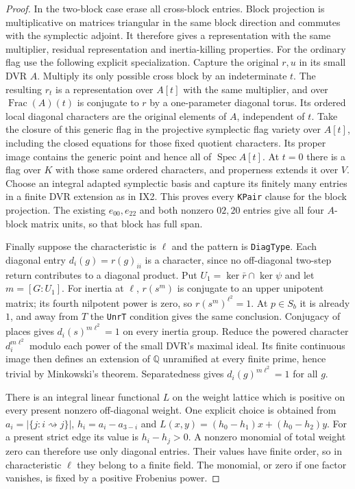 \begin{proof}
In the two-block case erase all cross-block entries.
Block projection is multiplicative on matrices triangular
in the same block direction and commutes with the
symplectic adjoint.  It therefore gives a representation
with the same multiplier, residual representation and
inertia-killing properties.  For the ordinary flag use
the following explicit specialization.  Capture the
original $r,u$ in its small DVR $A$.  Multiply its only
possible cross block by an indeterminate $t$.  The
resulting $r_t$ is a representation over $A[t]$ with the
same multiplier, and over $\operatorname{Frac}(A)(t)$
is conjugate to $r$ by a one-parameter diagonal torus.
Its ordered local diagonal characters are the original
elements of $A$, independent of $t$.
Take the closure of this generic flag in the projective
symplectic flag variety over $A[t]$, including the closed
equations for those fixed quotient characters.  Its
proper image contains the generic point and hence all
of $\operatorname{Spec}A[t]$.  At $t=0$ there is a flag
over $K$ with those same ordered characters, and
properness extends it over $V$.
Choose an integral adapted symplectic basis and capture
its finitely many entries in a finite DVR extension as
in IX2.  This proves every \texttt{KPair} clause for the
block projection.  The existing $e_{00},e_{22}$ and both
nonzero $02,20$ entries give all four $A$-block matrix
units, so that block has full span.

Finally suppose the characteristic is $\ell$ and the
pattern is \texttt{DiagType}.  Each diagonal entry
$d_i(g)=r(g)_{ii}$ is a character, since no off-diagonal
two-step return contributes to a diagonal product.
Put $U_1=\ker\bar r\cap\ker\psi$ and let $m=[G:U_1]$.
For inertia at $\ell$, $r(s^m)$ is conjugate to an upper
unipotent matrix; its fourth nilpotent power is zero, so
$r(s^m)^{\ell^2}=1$.  At $p\in S_b$ it is already $1$,
and away from $T$ the \texttt{UnrT} condition gives the
same conclusion.  Conjugacy of places gives
$d_i(s)^{m\ell^2}=1$ on every inertia group.
Reduce the powered character $d_i^{m\ell^2}$ modulo each power of the small
DVR's maximal ideal.  Its finite continuous image then
defines an extension of $\mathbb Q$ unramified at every
finite prime, hence trivial by Minkowski's theorem.
Separatedness gives $d_i(g)^{m\ell^2}=1$ for all $g$.

There is an integral linear functional $L$ on the weight
lattice which is positive on every present nonzero
off-diagonal weight.  One explicit choice is obtained
from $a_i=|\{j:i\rightsquigarrow j\}|$,
$h_i=a_i-a_{3-i}$ and
$L(x,y)=(h_0-h_1)x+(h_0-h_2)y$.
For a present strict edge its value is $h_i-h_j>0$.
A nonzero monomial of total weight zero can therefore
use only diagonal entries.  Their values have finite
order, so in characteristic $\ell$ they belong to a
finite field.  The monomial, or zero if one factor
vanishes, is fixed by a positive Frobenius power.
\end{proof}

